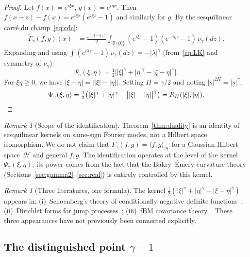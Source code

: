 \documentclass[11pt,a4paper]{article}
\theoremstyle{plain}
\theoremstyle{definition}
\theoremstyle{remark}
\newtheorem{remark}[theorem]{Remark}
\newcommand{\R}{\mathbb{R}}
\begin{document}
\begin{proof}
Let $f(x) = e^{i\xi x}$, $g(x) = e^{i\eta x}$.
Then $f(x+z) - f(x) = e^{i\xi x}(e^{i\xi z} - 1)$ and similarly
for $g$. By the sesquilinear carr\'e du champ~\eqref{eq:cdc}:
\begin{align*}
  \widetilde\Gamma_\gamma(f,g)(x)
  &= \frac{e^{i(\xi-\eta)x}}{2}\int_{\R \setminus \{0\}}
     (e^{i\xi z} - 1)(e^{-i\eta z} - 1)\,\nu_\gamma(dz).
\end{align*}
Expanding and using $\int (e^{i\lambda z} - 1)\,\nu_\gamma(dz)
= -|\lambda|^\gamma$ (from~\eqref{eq:LK} and symmetry of $\nu_\gamma$):
\[
  \Psi_\gamma(\xi,\eta)
  = \tfrac{1}{2}\bigl[|\xi|^\gamma + |\eta|^\gamma
  - |\xi - \eta|^\gamma\bigr].
\]
For $\xi\eta \geq 0$, we have $|\xi - \eta| = \bigl||\xi| - |\eta|\bigr|$.
Setting $H = \gamma/2$ and noting $|s|^{2H} = |s|^\gamma$,
\[
  \Psi_\gamma(\xi,\eta)
  = \tfrac{1}{2}\bigl(|\xi|^\gamma + |\eta|^\gamma
    - \bigl||\xi|-|\eta|\bigr|^\gamma\bigr)
  = R_H(|\xi|, |\eta|). \qedhere
\]
\end{proof}

\begin{remark}[Scope of the identification]\label{rem:scope}
Theorem~\ref{thm:duality} is an identity of sesquilinear kernels
on same-sign Fourier modes, not a Hilbert space isomorphism. We do not claim
that $\Gamma_\gamma(f,g) = \langle f,g \rangle_{\mathcal{H}}$ for
a Gaussian Hilbert space~$\mathcal{H}$ and general $f,g$.
The identification operates at the level of the kernel
$\Psi_\gamma(\xi,\eta)$; its power comes from the fact that the
Bakry--\'Emery curvature theory (Sections~\ref{sec:gamma2}--\ref{sec:real})
is entirely controlled by this kernel.
\end{remark}

\begin{remark}[Three literatures, one formula]\label{rem:three}
The kernel $\frac{1}{2}(|\xi|^\gamma + |\eta|^\gamma
- |\xi-\eta|^\gamma)$ appears in:
(i)~Schoenberg's theory of conditionally negative definite
functions~\cite{Schoenberg1938};
(ii)~Dirichlet forms for jump
processes~\cite{BoettcherSchillingWang2013};
(iii)~fBM covariance theory~\cite{Mishura2008}.
These three appearances have not previously been connected explicitly.
\end{remark}


\subsection{The distinguished point $\gamma = 1$}
\end{document}

